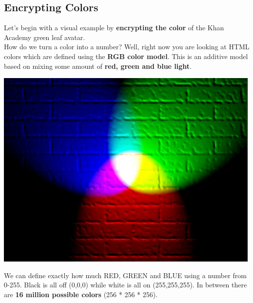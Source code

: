 \documentclass{report}
\begin{document}
\subsection{Encrypting Colors}
Let’s begin with a visual example by \textbf{encrypting the color} of the Khan Academy green leaf avatar.\\
How do we turn a color into a number? Well, right now you are looking at HTML colors which are defined using the \textbf{RGB color model}. This is an additive model based on mixing some amount of \textbf{red, green and blue light}.
\begin{center}
	\includegraphics[scale=1]{11.png}
\end{center}We can define exactly how much RED, GREEN and BLUE using a number from 0-255. Black is all off (0,0,0) while white is all on (255,255,255). In between there are \textbf{16 million possible colors} (256 * 256 * 256).
\newpage
\end{document}
